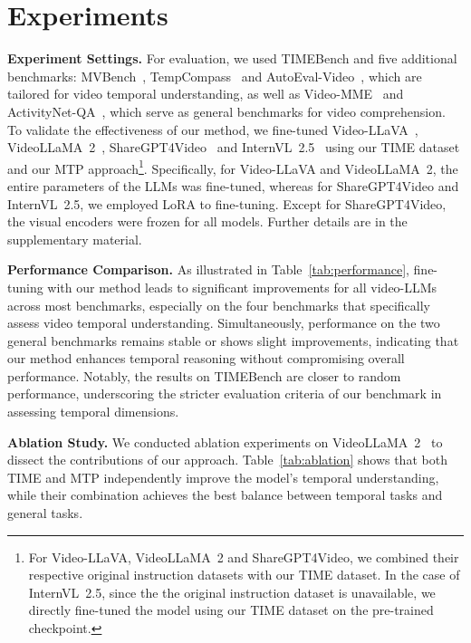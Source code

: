 

\section{Experiments}

\noindent\textbf{Experiment Settings.} For evaluation, we used TIMEBench and five additional benchmarks: MVBench~\cite{Li2024MVBench}, TempCompass~\cite{Liu2024TempCompass} and AutoEval-Video~\cite{Chen2023AutoEval}, which are tailored for video temporal understanding, as well as Video-MME~\cite{Fu2025Video-MME} and ActivityNet-QA~\cite{Yu2019ActivityNet}, which serve as general benchmarks for video comprehension. To validate the effectiveness of our method, we fine-tuned Video-LLaVA~\cite{Lin2024Video-LLaVA}, VideoLLaMA~2~\cite{Cheng2024VideoLLaMA}, ShareGPT4Video~\cite{Chen2024ShareGPT4Video} and InternVL~2.5~\cite{chen2024internvl} using our TIME dataset and our MTP approach\footnote{For Video-LLaVA, VideoLLaMA~2 and ShareGPT4Video, we combined their respective original instruction datasets with our TIME dataset. In the case of InternVL~2.5, since the the original instruction dataset is unavailable, we directly fine-tuned the model using our TIME dataset on the pre-trained checkpoint.}. Specifically, for Video-LLaVA and VideoLLaMA~2, the entire parameters of the LLMs was fine-tuned, whereas for ShareGPT4Video and InternVL~2.5, we employed LoRA to fine-tuning. Except for ShareGPT4Video, the visual encoders were frozen for all models. Further details are in the supplementary material.

\noindent\textbf{Performance Comparison.}
As illustrated in Table~\ref{tab:performance}, fine-tuning with our method leads to significant improvements for all video-LLMs across most benchmarks, especially on the four benchmarks that specifically assess video temporal understanding. 
Simultaneously, performance on the two general benchmarks remains stable or shows slight improvements, indicating that our method enhances temporal reasoning without compromising overall performance. Notably, the results on TIMEBench are closer to random performance, underscoring the stricter evaluation criteria of our benchmark in assessing temporal dimensions.



\noindent\textbf{Ablation Study.}
We conducted ablation experiments on VideoLLaMA~2~\cite{Cheng2024VideoLLaMA} to dissect the contributions of our approach. Table~\ref{tab:ablation} shows that both TIME and MTP independently improve the model's temporal understanding, while their combination achieves the best balance between temporal tasks and general tasks. 

